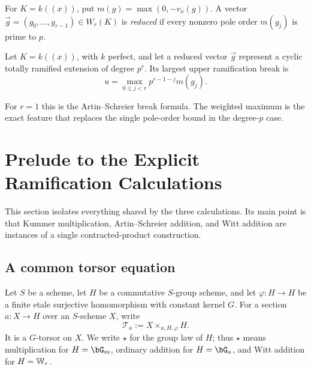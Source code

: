 \begin{definition}\label{definition:reduced_witt_vector}
For $K=k((x))$, put $m(g)=\max(0,-v_x(g))$. A vector
$\vec g=(g_0,\dots,g_{r-1})\in W_r(K)$ is \emph{reduced} if every nonzero pole
order $m(g_j)$ is prime to $p$.
\end{definition}

\begin{theorem}\label{theorem:schmid_witt_break_formula}
Let $K=k((x))$, with $k$ perfect, and let a reduced vector $\vec g$ represent
a cyclic totally ramified extension of degree $p^r$. Its largest upper
ramification break is
\[
    u=\max_{0\leq j<r}p^{r-1-j}m(g_j).
\]
\end{theorem}

For $r=1$ this is the Artin--Schreier break formula. The weighted maximum is
the exact feature that replaces the single pole-order bound in the degree-$p$
case.

\section{Prelude to the Explicit Ramification Calculations}

This section isolates everything shared by the three calculations. Its main
point is that Kummer multiplication, Artin--Schreier addition, and Witt
addition are instances of a single contracted-product construction.

\subsection{A common torsor equation}

Let $S$ be a scheme, let $H$ be a commutative $S$-group scheme, and let
$\varphi:H\to H$ be a finite etale surjective homomorphism with constant
kernel $G$. For a section $a:X\to H$ over an $S$-scheme $X$, write
\[
    \mathcal T_a:=X\times_{a,H,\varphi}H.
\]
It is a $G$-torsor on $X$. We write $\star$ for the group law of $H$; thus
$\star$ means multiplication for $H=\bG_m$, ordinary addition for
$H=\bG_a$, and Witt addition for $H=\mathbb{W}_r$.

